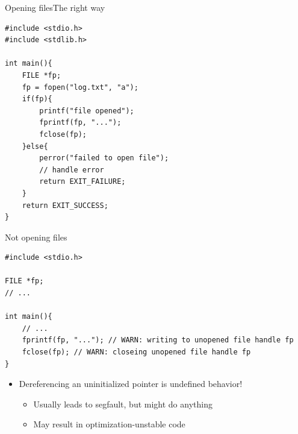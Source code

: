 \documentclass{beamer}
\begin{document}
\begin{frame}[fragile]{Opening files}{The right way}
\begin{lstlisting}
#include <stdio.h>
#include <stdlib.h>

int main(){
    FILE *fp;
    fp = fopen("log.txt", "a");
    if(fp){
        printf("file opened");
        fprintf(fp, "...");
        fclose(fp);
    }else{
        perror("failed to open file");
        // handle error
        return EXIT_FAILURE;
    }
    return EXIT_SUCCESS;
}
\end{lstlisting}
\end{frame}

\begin{frame}[fragile]{Not opening files}
\begin{lstlisting}
#include <stdio.h>

FILE *fp;
// ...

int main(){
    // ...
    fprintf(fp, "..."); // WARN: writing to unopened file handle fp
    fclose(fp); // WARN: closeing unopened file handle fp
}
\end{lstlisting}
\begin{itemize} \pause
\item Dereferencing an uninitialized pointer is undefined behavior!
	\begin{itemize}
	\item Usually leads to segfault, but might do anything
	\item May result in optimization-unstable code
	\end{itemize}
\end{itemize}
\end{frame}

%
\end{document}
